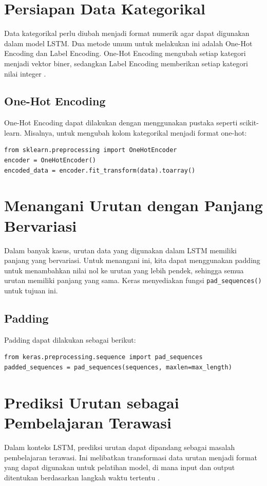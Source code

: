 \section{Persiapan Data Kategorikal}
\par Data kategorikal perlu diubah menjadi format numerik agar dapat digunakan dalam model LSTM. Dua metode umum untuk melakukan ini adalah One-Hot Encoding dan Label Encoding. One-Hot Encoding mengubah setiap kategori menjadi vektor biner, sedangkan Label Encoding memberikan setiap kategori nilai integer \citep{brownlee2017}.

\subsection{One-Hot Encoding}
\par One-Hot Encoding dapat dilakukan dengan menggunakan pustaka seperti scikit-learn. Misalnya, untuk mengubah kolom kategorikal menjadi format one-hot:
\begin{verbatim}
from sklearn.preprocessing import OneHotEncoder
encoder = OneHotEncoder()
encoded_data = encoder.fit_transform(data).toarray()
\end{verbatim}

\section{Menangani Urutan dengan Panjang Bervariasi}
\par Dalam banyak kasus, urutan data yang digunakan dalam LSTM memiliki panjang yang bervariasi. Untuk menangani ini, kita dapat menggunakan padding untuk menambahkan nilai nol ke urutan yang lebih pendek, sehingga semua urutan memiliki panjang yang sama. Keras menyediakan fungsi \texttt{pad\_sequences()} untuk tujuan ini.

\subsection{Padding}
\par Padding dapat dilakukan sebagai berikut:
\begin{verbatim}
from keras.preprocessing.sequence import pad_sequences
padded_sequences = pad_sequences(sequences, maxlen=max_length)
\end{verbatim}

\section{Prediksi Urutan sebagai Pembelajaran Terawasi}
\par Dalam konteks LSTM, prediksi urutan dapat dipandang sebagai masalah pembelajaran terawasi. Ini melibatkan transformasi data urutan menjadi format yang dapat digunakan untuk pelatihan model, di mana input dan output ditentukan berdasarkan langkah waktu tertentu \citep{brownlee2017}.


